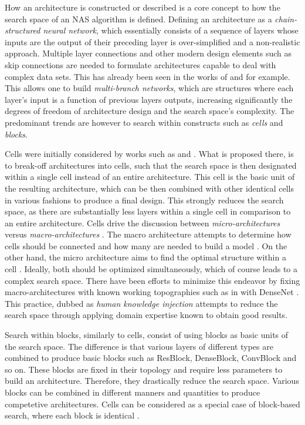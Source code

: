 \documentclass[10pt,        %
               a4paper,     %
               journal,     %
               ]{IEEEtran}
\begin{document}
How an architecture is constructed or described is a core concept to how the search space of an NAS algorithm is defined.
Defining an architecture as a \textit{chain-structured neural network}, which essentially consists of a
sequence of layers whose inputs are the output of their preceding layer is over-simplified and a non-realistic approach.
Multiple layer connections and other modern design elements such as skip connections are needed to formulate architectures
capable to deal with complex data sets. This has already been seen in the works of \cite{zoph2016neural} and \cite{pmlr-v70-real17a}
for example.
This allows one to build \textit{multi-branch networks}, which are structures where each layer's input is a function of
previous layers outputs, increasing significantly the degrees of freedom of architecture design and the search space's complexity.
The predominant trends are however to search within constructs such as \textit{cells} and \textit{blocks}.

Cells were initially considered by works such as \cite{zhong2018practical} and \cite{zoph2018learning}. What is proposed there,
is to break-off architectures into cells, such that
the search space is then designated within a single cell instead of an entire architecture. This cell is the basic unit of the
resulting architecture, which can be then combined with other identical cells in various fashions to produce a final design.
This strongly reduces the search space, as there are substantially less layers within a single cell in comparison to
an entire architecture. Cells drive the discussion between \textit{micro-architectures} versus \textit{macro-architectures}
\cite{elsken2019neural}. The macro architecture
attempts to determine how cells should be connected and how many are needed to build a model \cite{elsken2019neural}. On the other hand, the micro
architecture aims to find the optimal structure within a cell \cite{elsken2019neural}. Ideally, both should be optimized simultaneously, which of course
leads to a complex search space. There have been efforts to minimize this endeavor by fixing macro-architectures with
known working topographies such as in \cite{pmlr-v80-cai18a} with DenseNet \cite{Huang_2017_CVPR}. This practice, dubbed as
\textit{human knowledge injection} attempts to reduce the search space through applying domain expertise known to obtain good
results.

Search within blocks, similarly to cells, consist of using blocks as basic units of the search space. The difference is that
various layers of different types
are combined to produce basic blocks such as ResBlock, DenseBlock, ConvBlock and so on. These blocks are fixed in their topology
and require less parameters to build an architecture. Therefore, they drastically reduce the search space. Various blocks can be combined
in different manners and quantities to produce competetive architectures. Cells can be considered as a special case of block-based
search, where each block is identical \cite{liu2021survey}.
\end{document}
